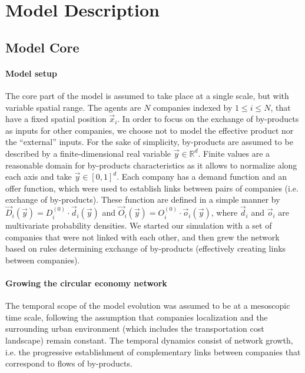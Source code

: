 \documentclass[fleqn,10pt]{wlscirep}
\begin{document}
\section{Model Description}

\subsection{Model Core}

\paragraph{Model setup}

The core part of the model is assumed to take place at a single scale, but with variable spatial range. The agents are $N$ companies indexed by $1\leq i\leq N$, that have a fixed spatial position $\vec{x}_i$. In order to focus on the exchange of by-products as inputs for other companies, we choose not to model the effective product nor the ``external'' inputs. For the sake of simplicity, by-products are assumed to be described by a finite-dimensional real variable $\vec{y}\in \mathbb{R}^d$. Finite values are a reasonable domain for by-products characteristics as it allows to normalize along each axis and take $\vec{y} \in \left[0,1\right]^d$. Each company has a demand function and an offer function, which were used to establish links between pairs of companies (i.e. exchange of by-products). These function are defined in a simple manner by $\vec{D}_i (\vec{y})= D_i^{(0)}\cdot \vec{d}_i (\vec{y})$ and $\vec{O}_i (\vec{y})= O_i^{(0)}\cdot \vec{o}_i (\vec{y})$, where $\vec{d}_i$ and $\vec{o}_i$ are multivariate probability densities. We started our simulation with a set of companies that were not linked with each other, and then grew the network based on rules determining exchange of by-products (effectively creating links between companies).



\paragraph{Growing the circular economy network}

The temporal scope of the model evolution was assumed to be at a mesoscopic time scale, following the assumption that companies localization and the surrounding urban environment (which includes the transportation cost landscape) remain constant. The temporal dynamics consist of network growth, i.e. the progressive establishment of complementary links between companies that correspond to flows of by-products.
\end{document}
